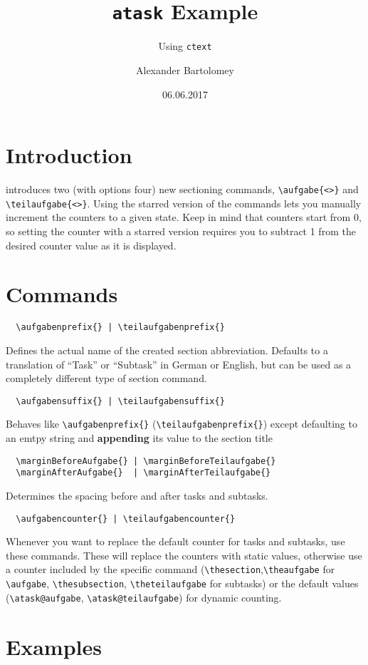 \documentclass{ctext}
\title{\texttt{atask} Example}
\subtitle{Using \texttt{ctext}}
\author{Alexander Bartolomey}
\date{06.06.2017}
\begin{document}
\maketitle
\tableofcontents*

\section{Introduction}
\atask introduces two (with options four) new sectioning commands, \verb|\aufgabe{<>}| and \\ \verb|\teilaufgabe{<>}|. Using the starred version of the commands lets you manually increment the counters to a given state. Keep in mind that counters start from 0, so setting the counter with a starred version requires you to subtract 1 from the desired counter value as it is displayed.
\vfill
\section{Commands}
\begin{verbatim}
  \aufgabenprefix{} | \teilaufgabenprefix{}
\end{verbatim}
Defines the actual name of the created section abbreviation.
Defaults to a translation of "`Task"' or "`Subtask"' in German or English, but can be used as a completely different type of section command.
\begin{verbatim}
  \aufgabensuffix{} | \teilaufgabensuffix{}
\end{verbatim}
Behaves like \verb|\aufgabenprefix{}| (\verb|\teilaufgabenprefix{}|) except defaulting to an emtpy string and \textbf{appending} its value to the section title
\begin{verbatim}
  \marginBeforeAufgabe{} | \marginBeforeTeilaufgabe{}
  \marginAfterAufgabe{}  | \marginAfterTeilaufgabe{}
\end{verbatim}
Determines the spacing before and after tasks and subtasks.
\begin{verbatim}
  \aufgabencounter{} | \teilaufgabencounter{}
\end{verbatim}
Whenever you want to replace the default counter for tasks and subtasks, use these commands. These will replace the counters with static values, otherwise use a counter included by the specific command (\verb|\thesection|,\verb|\theaufgabe| for \verb|\aufgabe|, \verb|\thesubsection|, \verb|\theteilaufgabe| for subtasks) or the default values (\verb|\atask@aufgabe|, \verb|\atask@teilaufgabe|) for dynamic counting.
\section{Examples}
\end{document}
